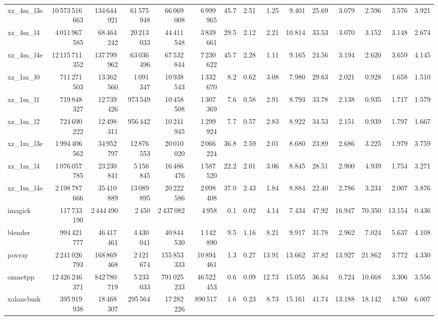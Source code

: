 \documentclass[9pt,landscape,a4paper]{article}
\begin{document}
\begin{adjustbox}{max width=\textwidth, max totalheight=0.50\textheight}
\begin{tabular}{lrrrrrrrrrrrrrr}
xz\_4m\_l3e & 10\,573\,516\,663 & 134\,644\,921 & 61\,575\,948 & 66\,069\,008 & 6\,999\,965 & 45.7 & 2.51 & 1.25 & 9.401 & 25.69 & 3.079 & 2.596 & 3.576 & 3.921 \\
xz\_4m\_l4 & 4\,011\,967\,585 & 68\,464\,242 & 20\,213\,033 & 44\,411\,548 & 3\,839\,661 & 29.5 & 2.12 & 2.21 & 10.814 & 33.53 & 3.070 & 3.152 & 3.148 & 2.674 \\
xz\_4m\_l4e & 12\,115\,711\,352 & 137\,799\,962 & 63\,036\,496 & 67\,532\,844 & 7\,230\,622 & 45.7 & 2.28 & 1.11 & 9.165 & 24.56 & 3.194 & 2.620 & 3.659 & 4.145 \\
xz\_1m\_l0 & 711\,271\,503 & 13\,362\,560 & 1\,091\,347 & 10\,938\,543 & 1\,332\,670 & 8.2 & 0.62 & 3.08 & 7.980 & 29.63 & 2.021 & 0.928 & 1.658 & 1.510 \\
xz\_1m\_l1 & 719\,848\,327 & 12\,739\,426 & 973\,549 & 10\,458\,508 & 1\,307\,369 & 7.6 & 0.58 & 2.91 & 8.793 & 33.78 & 2.138 & 0.935 & 1.717 & 1.579 \\
xz\_1m\_l2 & 724\,690\,222 & 12\,498\,311 & 956\,442 & 10\,241\,945 & 1\,299\,924 & 7.7 & 0.57 & 2.83 & 8.922 & 34.53 & 2.151 & 0.939 & 1.797 & 1.667 \\
xz\_1m\_l3e & 1\,994\,406\,562 & 34\,952\,797 & 12\,876\,553 & 20\,010\,020 & 2\,066\,224 & 36.8 & 2.59 & 2.01 & 8.680 & 23.89 & 2.686 & 3.225 & 1.979 & 3.759 \\
xz\_1m\_l4 & 1\,076\,057\,785 & 23\,230\,841 & 5\,156\,845 & 16\,486\,476 & 1\,587\,520 & 22.2 & 2.01 & 3.06 & 8.845 & 28.51 & 2.900 & 4.939 & 1.754 & 3.271 \\
xz\_1m\_l4e & 2\,198\,787\,666 & 35\,410\,889 & 13\,089\,895 & 20\,222\,586 & 2\,098\,408 & 37.0 & 2.43 & 1.84 & 8.884 & 22.40 & 2.786 & 3.234 & 2.007 & 3.876 \\
imagick & 117\,733\,190 & 2\,444\,490 & 2\,450 & 2\,437\,082 & 4\,958 & 0.1 & 0.02 & 4.14 & 7.434 & 47.92 & 16.947 & 70.350 & 13.154 & 0.436 \\
blender & 994\,421\,777 & 46\,417\,461 & 4\,430\,041 & 40\,844\,530 & 1\,142\,890 & 9.5 & 1.16 & 8.21 & 9.917 & 31.78 & 2.962 & 7.024 & 5.637 & 4.108 \\
povray & 2\,241\,026\,793 & 168\,869\,468 & 2\,121\,674 & 155\,853\,333 & 10\,894\,461 & 1.3 & 0.27 & 13.91 & 13.662 & 37.82 & 13.927 & 21.862 & 3.772 & 4.330 \\
omnetpp & 12\,426\,246\,371 & 842\,780\,719 & 5\,233\,033 & 791\,025\,233 & 46\,522\,453 & 0.6 & 0.09 & 12.73 & 15.055 & 36.64 & 0.724 & 10.668 & 3.306 & 3.556 \\
xalancbmk & 395\,919\,938 & 18\,468\,307 & 295\,564 & 17\,282\,226 & 890\,517 & 1.6 & 0.23 & 8.73 & 15.161 & 41.74 & 13.188 & 18.142 & 4.760 & 6.007 \\

\end{tabular}
\end{adjustbox}
\end{document}
